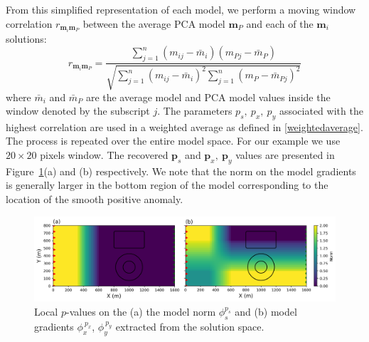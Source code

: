 \documentclass[extra,referee]{gji}
\begin{document}
From this simplified representation of each model, we perform a moving window correlation $r_{\mathbf{m}_i\mathbf{m}_P}$ between the average PCA model $\mathbf{m}_P$ and each of the $\mathbf{m}_i$ solutions:
\begin{equation}
r_{\mathbf{m}_i\mathbf{m}_P} = \frac{\sum_{j=1}^n (m_{ij} - \bar m_{i})({m_{Pj}-\bar m_{P}})}{\sqrt{\sum_{j=1}^n(m_{ij} - \bar m_{i})^2\sum_{j=1}^n(m_{P} - \bar m_{Pj})^2}}
\end{equation}
where $\bar m_{i}$ and $\bar m_{P}$ are the average model and PCA model values inside the window denoted by the subscript $j$.
The parameters $p_s,\: p_x,\: p_y$ associated with the highest correlation are used in a weighted average as defined in \eqref{weightedaverage}. The process is repeated over the entire model space. For our example we use $20 \times 20$ pixels window. The recovered $\mathbf{p}_s$ and $\mathbf{p}_x,\:\mathbf{p}_y$ values are presented in Figure~\ref{MixedNorms}(a) and (b) respectively. We note that the norm on the model gradients is generally larger in the bottom region of the model corresponding to the location of the smooth positive anomaly.
\begin{figure}
\includegraphics[width=\columnwidth]{Figures/Tomo2D_Average_pq.png}
\caption{Local $p$-values on the (a) the model norm $\phi_s^{p_s}$ and (b) model gradients $\phi_{x}^{\:p_x}$, $\phi_{y}^{\:p_y}$ extracted from the solution space.}
\label{MixedNorms}
\end{figure}
\end{document}
